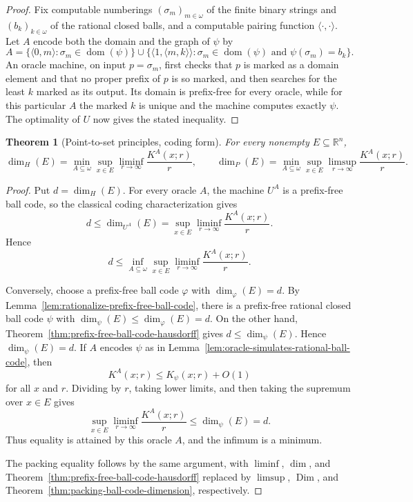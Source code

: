 \documentclass[a4paper,oneside,reqno,12pt]{amsart}
\theoremstyle{plain}
\newtheorem{theorem}{Theorem}[section]
\theoremstyle{definition}
\theoremstyle{remark}
\DeclareMathOperator{\Dim}{Dim}
\DeclareMathOperator{\dom}{dom}
\begin{document}
\begin{proof}
Fix computable numberings \((\sigma_m)_{m\in\omega}\) of the finite binary
strings and \((b_k)_{k\in\omega}\) of the rational closed balls, and a computable
pairing function \(\langle\cdot,\cdot\rangle\).  Let \(A\) encode both the domain
and the graph of \(\psi\) by
\[
A=
\{\langle 0,m\rangle:\sigma_m\in\dom(\psi)\}
\cup
\{\langle 1,\langle m,k\rangle\rangle:
\sigma_m\in\dom(\psi)\text{ and }\psi(\sigma_m)=b_k\}.
\]
An oracle machine, on input \(p=\sigma_m\), first checks that \(p\) is marked as
a domain element and that no proper prefix of \(p\) is so marked, and then
searches for the least \(k\) marked as its output.  Its domain is prefix-free
for every oracle, while for this particular \(A\) the marked \(k\) is unique and
the machine computes exactly \(\psi\).
The optimality of \(U\) now gives the stated inequality.
\end{proof}

\begin{theorem}[Point-to-set principles, coding form]
\label{thm:point-to-set-coding}
For every nonempty \(E\subseteq\mathbb R^n\),
\[
\dim_H(E)
=
\min_{A\subseteq\omega}
\sup_{x\in E}
\liminf_{r\to\infty}\frac{K^A(x;r)}{r},
\qquad
\dim_P(E)
=
\min_{A\subseteq\omega}
\sup_{x\in E}
\limsup_{r\to\infty}\frac{K^A(x;r)}{r}.
\]
\end{theorem}

\begin{proof}
Put \(d=\dim_H(E)\).  For every oracle \(A\), the machine \(U^A\) is a
prefix-free ball code, so the classical coding characterization gives
\[
d\le \dim_{U^A}(E)
=
\sup_{x\in E}\liminf_{r\to\infty}\frac{K^A(x;r)}{r}.
\]
Hence
\[
d\le
\inf_{A\subseteq\omega}
\sup_{x\in E}\liminf_{r\to\infty}\frac{K^A(x;r)}{r}.
\]

Conversely, choose a prefix-free ball code \(\varphi\) with
\(\dim_\varphi(E)=d\).  By
Lemma~\ref{lem:rationalize-prefix-free-ball-code}, there is a prefix-free
rational closed ball code \(\psi\) with
\(\dim_\psi(E)\le\dim_\varphi(E)=d\).  On the other hand,
Theorem~\ref{thm:prefix-free-ball-code-hausdorff} gives
\(d\le\dim_\psi(E)\).  Hence \(\dim_\psi(E)=d\).  If \(A\) encodes \(\psi\) as in
Lemma~\ref{lem:oracle-simulates-rational-ball-code}, then
\[
K^A(x;r)\le K_\psi(x;r)+O(1)
\]
for all \(x\) and \(r\).  Dividing by \(r\), taking lower limits, and then
taking the supremum over \(x\in E\) gives
\[
\sup_{x\in E}\liminf_{r\to\infty}\frac{K^A(x;r)}{r}
\le \dim_\psi(E)=d.
\]
Thus equality is attained by this oracle \(A\), and the infimum is a minimum.

The packing equality follows by the same argument, with \(\liminf\), \(\dim\), and
Theorem~\ref{thm:prefix-free-ball-code-hausdorff} replaced by \(\limsup\),
\(\Dim\), and Theorem~\ref{thm:packing-ball-code-dimension}, respectively.
\end{proof}
\end{document}
